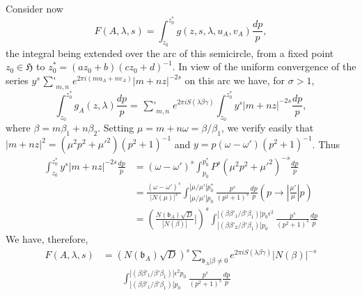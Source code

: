 Consider now
$$
F(A,\lambda,s)=\int^{z^{\ast}_{0}}_{z_{0}}g(z,s,\lambda,u_{A},v_{A})\frac{dp}{p},
$$
the integral being extended over the arc of this semicircle, from a
fixed point $z_{0}\in\mathfrak{H}$ to
$z^{\ast}_{0}=(az_{0}+b)(cz_{0}+d)^{-1}$. In view of the uniform
convergence of the series $y^{s}\mathop{{\sum}'}_{m,n}e^{2\pi
  i(mu_{A}+nv_{A})}|m+nz|^{-2s}$ on this arc we have, for $\sigma>1$, 
$$
\int^{z^{\ast}_{0}}_{z_{0}}g_{A}(z,\lambda)\frac{dp}{p}=\mathop{{\sum}'}_{m,n}e^{2\pi
  iS(\lambda\beta\gamma)}\int^{z^{\ast}_{0}}_{z_{0}}y^{s}|m+nz|^{-2s}\frac{dp}{p},
$$\pageoriginale
where $\beta=m\beta_{1}+n\beta_{2}$. Setting
$\mu=m+n\omega=\beta/\beta_{1}$, we verify easily that
$|m+nz|^{2}=(\mu^{2}p^{2}+{\mu'}^{2})(p^{2}+1)^{-1}$ and
$y=p(\omega-\omega')(p^{2}+1)^{-1}$. Thus 
\begin{align*}
\int^{z^{\ast}_{0}}_{z_{0}}y^{s}|m+nz|^{-2s}\frac{dp}{p} &=
(\omega-\omega')^{s}\int^{p^{\ast}_{0}}_{p_{0}}P^{s}(\mu^{2}p^{2}+{\mu'}^{2})^{-s}\frac{dp}{p}\\
&=
\frac{(\omega-\omega')^{s}}{|N(\mu)|^{s}}\int^{|\mu/\mu'|p^{\ast}_{0}}_{|\mu/\mu'|p_{0}}\frac{p^{s}}{(p^{2}+1)^{s}}\frac{dp}{p}\left(p\to
\left|\frac{\mu'}{\mu}\right|p\right)\\
&=
\left(\frac{N(\mathfrak{b}_{A})\sqrt{D}}{|N(\beta)|}|\right)^{s}\int^{|(\beta\beta'_{1}/\beta'\beta_{1})|p_{0}\epsilon^{2}}_{|(\beta\beta'_{2}/\beta'\beta_{1})|p_{0}}\frac{p^{s}}{(p^{2}+1)^{s}}\frac{dp}{p} 
\end{align*}
We have, therefore,
\begin{align*}
F(A,\lambda,s)&=(N(\mathfrak{b}_{A})\sqrt{D})^{s}\sum_{\mathfrak{b}_{A}|\beta\neq
  0}e^{2\pi
  iS(\lambda\beta\gamma)}|N(\beta)|^{-s}\\
&\qquad\int^{|(\beta\beta'_{1}/\beta'\beta_{1})|\epsilon^{2}p_{0}}_{|(\beta
\beta'_{1}/\beta'\beta_{1})|p_{0}}\frac{p^{s}}{(p^{2}+1)^{s}}\frac{dp}{p}\tag{99}\label{99} 
\end{align*}

